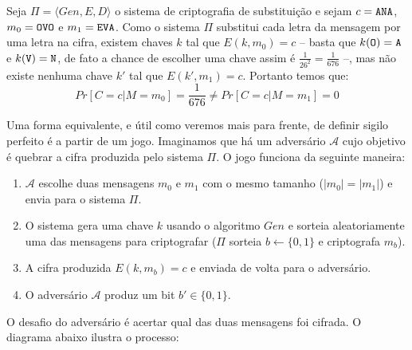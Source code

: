 \begin{example}
  Seja $\Pi = \langle Gen, E, D \rangle$ o sistema de criptografia de substituição e sejam $c = \textrm{\tt ANA}$, $m_0 = \textrm{\tt OVO}$ e $m_1 = \textrm{\tt EVA}$.
Como o sistema $\Pi$ substitui cada letra da mensagem por uma letra na cifra, existem chaves $k$ tal que $E(k, m_0) = c$ -- basta que $k(\textrm{\tt O}) = \textrm{\tt A}$ e $k(\textrm{\tt V}) = \textrm{\tt N}$, de fato a chance de escolher uma chave assim é $\frac{1}{26^2} = \frac{1}{676}$ --, mas não existe nenhuma chave $k'$ tal que $E(k', m_1) = c$.
Portanto temos que:
\begin{displaymath}
Pr[C = c | M = m_0] =  \frac{1}{676} \neq Pr[C = c | M = m_1] = 0  
\end{displaymath}
\end{example}

Uma forma equivalente, e útil como veremos mais para frente, de definir sigilo perfeito é a partir de um jogo.
Imaginamos que há um adversário $\mathcal{A}$ cujo objetivo é quebrar a cifra produzida pelo sistema $\Pi$.
O jogo funciona da seguinte maneira: 
\begin{enumerate}
\item $\mathcal{A}$ escolhe duas mensagens $m_0$ e $m_1$ com o mesmo tamanho ($|m_0| = |m_1|$) e envia para o sistema $\Pi$.
\item O sistema gera uma chave $k$ usando o algoritmo $Gen$ e sorteia aleatoriamente uma das mensagens para criptografar ($\Pi$ sorteia $b \leftarrow \{0, 1\}$ e criptografa $m_b$).
\item A cifra produzida $E(k, m_b) = c$ e enviada de volta para o adversário.
\item O adversário $\mathcal{A}$ produz um bit $b' \in \{0,1\}$.
\end{enumerate}

O desafio do adversário é acertar qual das duas mensagens foi cifrada.
O diagrama abaixo ilustra o processo:

\begin{center}
\end{center}

